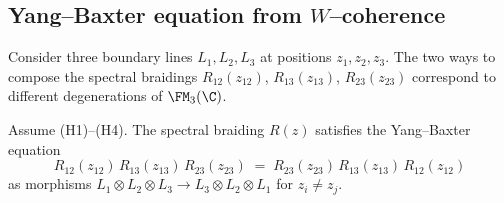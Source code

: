 \subsection{Yang–Baxter equation from $W$–coherence}
Consider three boundary lines $L_1,L_2,L_3$ at positions $z_1,z_2,z_3$.
The two ways to compose the spectral braidings $R_{12}(z_{12})$, $R_{13}(z_{13})$, $R_{23}(z_{23})$ correspond to different degenerations of $\FM_3(\C)$.

\begin{theorem}
Assume \textrm{(H1)--(H4)}.
The spectral braiding $R(z)$ satisfies the Yang–Baxter equation
\[
R_{12}(z_{12})\,R_{13}(z_{13})\,R_{23}(z_{23}) \;=\; R_{23}(z_{23})\,R_{13}(z_{13})\,R_{12}(z_{12})
\]
as morphisms $L_1\otimes L_2\otimes L_3 \to L_3\otimes L_2\otimes L_1$ for $z_i\neq z_j$.
\end{theorem}

